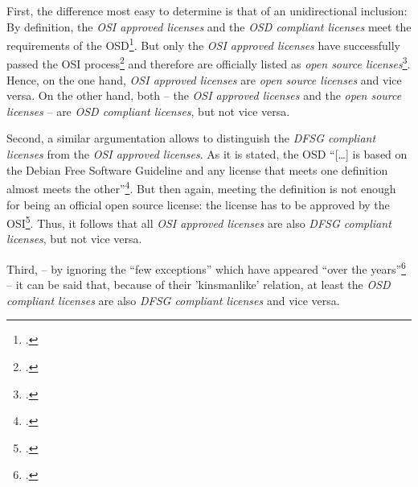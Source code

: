 First, the difference most easy to determine is that of an unidirectional
inclusion: By definition, the \emph{OSI approved licenses} and the \emph{OSD
compliant licenses} meet the requirements of the OSD\footcite[cf.][\nopage
wp]{OSI2012a}. But only the \emph{OSI approved licenses} have successfully
passed the OSI process\footcite[cf.][\nopage wp]{OSI2012a} and therefore are
officially listed as \emph{open source licenses}\footcite[cf.][\nopage
wp]{OSI2012b}. Hence, on the one hand, \emph{OSI approved licenses} are
\emph{open source licenses} and vice versa. On the other hand, both -- the
\emph{OSI approved licenses} and the \emph{open source licenses} -- are
\emph{OSD compliant licenses}, but not vice versa.

Second, a similar argumentation allows to distinguish the \emph{DFSG compliant
licenses} from the \emph{OSI approved licenses}. As it is stated, the OSD
\enquote{[\ldots] is based on the Debian Free Software Guideline and any
license that meets one definition almost meets the
other}\footcite[cf.][233]{Fogel2006a}. But then again, meeting the definition is
not enough for being an official open source license: the license has to be
approved by the OSI\footcite[cf.][\nopage wp]{OSI2012b}. Thus, it follows that
all \emph{OSI approved licenses} are also \emph{DFSG compliant licenses}, but
not vice versa.

Third, -- by ignoring the \enquote{few exceptions} which have appeared
\enquote{over the years}\footcite[cf.][233]{Fogel2006a} -- it can be said that,
because of their 'kinsmanlike' relation, at least the \emph{OSD compliant
licenses} are also \emph{DFSG compliant licenses} and vice versa.

